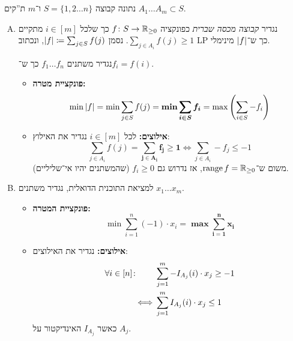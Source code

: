 \documentclass[]{../../../../tex/classes/homework}
\begin{document}
	\section{}
	נתונה קבוצה $S = \{1, 2 \dots n\}$ ו־$m$ ת''קים $A_1 \dots A_m \subset S$. 
	\begin{enumerate}[(A)]
		\item נגדיר \textit{קבוצה מכסה שברית} כפונקציה $f \colon S \to \mathbb{R}_{\ge 0}$ כך שלכל $i \in [m]$ מתקיים $\sum_{j \in A_i}f(j) \ge 1$. נסמן $\left \lvert f \right \rvert \coloneqq \sum_{j \in S}f(j)$, ונכתוב LP כך ש־$\left \lvert f \right \rvert$ מינימלי. 
		
		נגדיר משתנים $f_1 \dots f_n$ כך ש־$f_i = f(i)$. 
		\begin{itemize}
			\item \textbf{פונקציית מטרה: }
			\[ \min \left \lvert f \right \rvert = \min \sum_{j \in S} f(j) = \bm{\min \sum_{i \in S}f_i} = \max\left ( \sum_{i \in S}- f_i \right ) \]
			\item \textbf{אילוצים: }לכל $i \in [m]$ נגדיר את האילוץ: 
			\[ \sum_{j \in A_i}f(j) = \bm{\sum_{j \in A_i}f_j \ge 1} \iff \sum_{j \in A_i}-f_j \le -1 \]
			משום ש־$\operatorname{range} f = \mathbb{R}_{\ge 0}$, אז נדרוש גם $f_i \ge 0$ (שהמשתנים יהיו אי־שליליים). 
		\end{itemize}
		\item למציאת התוכנית הדואלית, נגדיר משתנים $x_1 \dots x_m$. 
		\begin{itemize}
			\item \textbf{פונקציית המטרה: }\[ \min \sum_{i = 1}^{n}(-1) \cdot x_i = \bm{\max \sum_{i = 1}^{n}x_i} \]
			\item \textbf{אילוצים: }נגדיר את האילוצים: 
			\begin{align*}
				\forall i \in [n] \colon \quad\quad &\sum_{j = 1}^{m}-I_{A_j}(i)\cdot x_j \ge -1 \\
				\iff &  \sum_{j = 1}^{m}I_{A_j}(i) \cdot x_j \le 1
			\end{align*}
			כאשר $I_{A_j}$ האינדיקטור על $A_j$. 
			

\end{itemize}
\end{enumerate}
\end{document}

